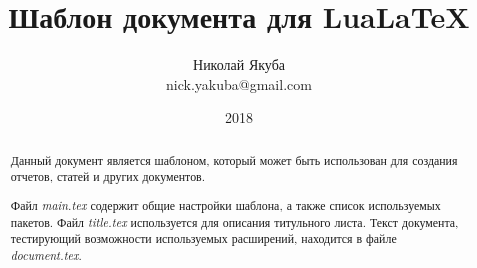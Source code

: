 
\sloppy
{}  %
\clearpage

\title{Шаблон документа для LuaLaTeX}
\author{Николай Якуба\\nick.yakuba@gmail.com}
\date{2018}

\maketitle
\thispagestyle{empty}  %



\cleardoublepage  %

\pagestyle{plain}  %
\setcounter{page}{2}  %

\begin{abstract}
  Данный документ является шаблоном, который может быть использован для создания отчетов, статей и других документов.

  Файл {\em main.tex} содержит общие настройки шаблона, а также список используемых пакетов.
  Файл {\em title.tex} используется для описания титульного листа.
  Текст документа, тестирующий возможности используемых расширений, находится в файле {\em document.tex}.
\end{abstract}

\setcounter{tocdepth}{3}  %
\hypertarget{contents}{}  %
\tableofcontents
\clearpage

